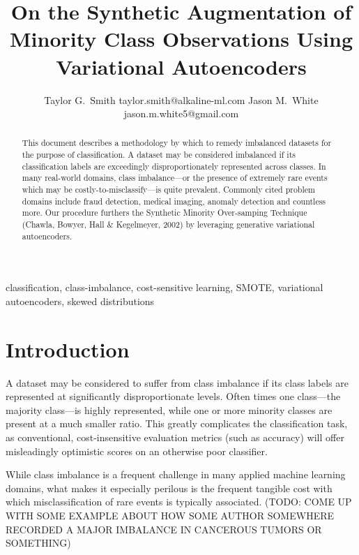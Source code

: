 \documentclass[twoside,11pt]{article}
\begin{document}
\title{On the Synthetic Augmentation of Minority Class Observations Using Variational Autoencoders}

\author{\name Taylor G.\ Smith \email taylor.smith@alkaline-ml.com
       \AND
       \name Jason M.\ White \email jason.m.white5@gmail.com}

\maketitle

\begin{abstract}%
This document describes a methodology by which to remedy imbalanced datasets for the purpose of classification. A dataset may be considered imbalanced if its classification labels are exceedingly disproportionately represented across classes. In many real-world domains, class imbalance---or the presence of extremely rare events which may be costly-to-misclassify---is quite prevalent. Commonly cited problem domains include fraud detection, medical imaging, anomaly detection and countless more.  Our procedure furthers the Synthetic Minority Over-samping Technique (Chawla, Bowyer, Hall \& Kegelmeyer, 2002) by leveraging generative variational autoencoders.
\end{abstract}

\begin{keywords}
  classification, class-imbalance, cost-sensitive learning, SMOTE, variational autoencoders, skewed distributions
\end{keywords}

\section{Introduction}

A dataset may be considered to suffer from class imbalance if its class labels are represented at significantly disproportionate levels. Often times one class---the majority class---is highly represented, while one or more minority classes are present at a much smaller ratio. This greatly complicates the classification task, as conventional, cost-insensitive evaluation metrics (such as accuracy) will offer misleadingly optimistic scores on an otherwise poor classifier. 

While class imbalance is a frequent challenge in many applied machine learning domains, what makes it especially perilous is the frequent tangible cost with which misclassification of rare events is typically associated. (TODO: COME UP WITH SOME EXAMPLE ABOUT HOW SOME AUTHOR SOMEWHERE RECORDED A MAJOR IMBALANCE IN CANCEROUS TUMORS OR SOMETHING)
\end{document}
